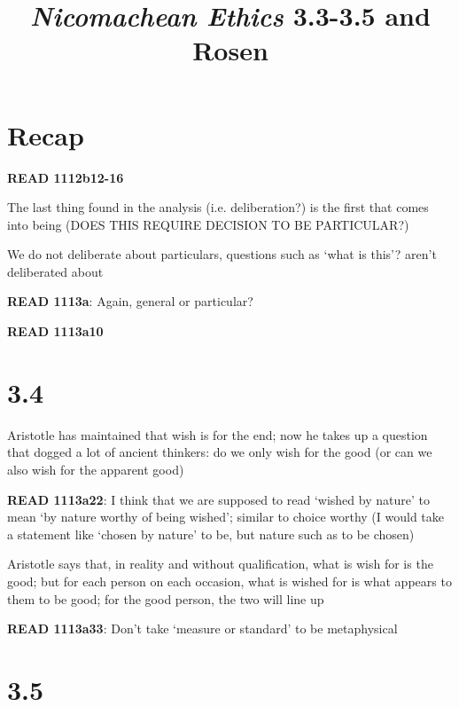 \documentclass[11pt]{article}
\title{\emph{Nicomachean Ethics} 3.3-3.5 and Rosen}
\author{}
\date{}
\begin{document}
\maketitle

\section*{Recap}

\noindent\textbf{READ 1112b12-16}
\vspace*{2mm}

\noindent The last thing found in the analysis (i.e. deliberation?) is the first that comes into being (DOES THIS REQUIRE DECISION TO BE PARTICULAR?)
\vspace*{2mm}

\noindent We do not deliberate about particulars, questions such as `what is this'? aren't deliberated about
\vspace*{2mm}

\noindent\textbf{READ 1113a}: Again, general or particular?
\vspace*{2mm}

\noindent\textbf{READ 1113a10}

\section*{3.4}

\noindent Aristotle has maintained that wish is for the end; now he takes up a question that dogged a lot of ancient thinkers: do we only wish for the good (or can we also wish for the apparent good)
\vspace*{2mm}

\noindent\textbf{READ 1113a22}: I think that we are supposed to read `wished by nature' to mean `by nature worthy of being wished'; similar to choice worthy (I would take a statement like `chosen by nature' to be, but nature such as to be chosen)
\vspace*{2mm}

\noindent Aristotle says that, in reality and without qualification, what is wish for is the good; but for each person on each occasion, what is wished for is what appears to them to be good; for the good person, the two will line up
\vspace*{2mm}

\noindent\textbf{READ 1113a33}: Don't take `measure or standard' to be metaphysical

\section*{3.5}
\end{document}
